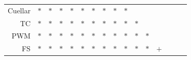\documentclass[11pt]{article}
\begin{document}
\begin{table}[h!]
\begin{center}
\begin{tabular}{ rccccccccccccccc }
    Cuellar & $*$ & $*$ & $*$ & $*$ & $*$ & $*$ & $*$ & $*$ & $*$ &     &     &     &     &     &     \\
    TC & $*$ & $*$ & $*$ & $*$ & $*$ & $*$ & $*$ & $*$ & $*$ & $*$ &     &     &     &     &     \\
    PWM & $*$ & $*$ & $*$ & $*$ & $*$ & $*$ & $*$ & $*$ & $*$ & $*$ & $*$ &     &     &     &     \\
    FS & $*$ & $*$ & $*$ & $*$ & $*$ & $*$ & $*$ & $*$ & $*$ & $*$ & $*$ & $+$ &     &     &     \\
    \hline
  \end{tabular}
\end{center}
\vspace{0.0cm}
\end{table}

\clearpage
\end{document}
